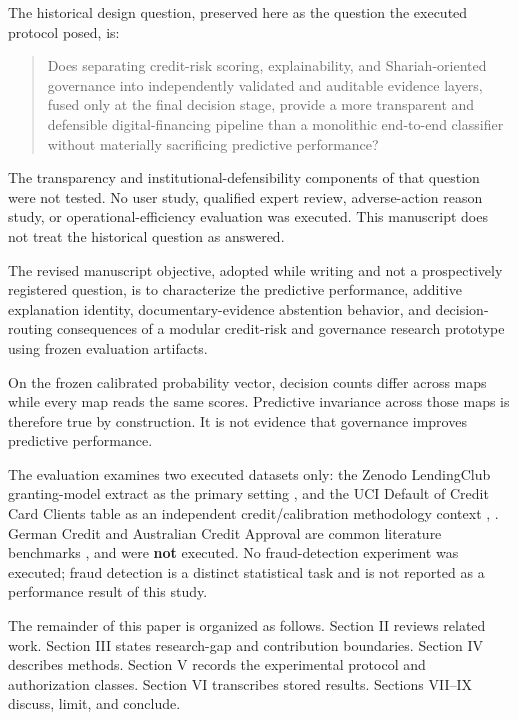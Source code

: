 \documentclass{ieeeaccess}
\begin{document}
The historical design question, preserved here as the question the executed protocol posed, is:

\begin{quote}
Does separating credit-risk scoring, explainability, and Shariah-oriented governance into independently validated and auditable evidence layers, fused only at the final decision stage, provide a more transparent and defensible digital-financing pipeline than a monolithic end-to-end classifier without materially sacrificing predictive performance?
\end{quote}

The transparency and institutional-defensibility components of that question were not tested. No user study, qualified expert review, adverse-action reason study, or operational-efficiency evaluation was executed. This manuscript does not treat the historical question as answered.

The revised manuscript objective, adopted while writing and not a prospectively registered question, is to characterize the predictive performance, additive explanation identity, documentary-evidence abstention behavior, and decision-routing consequences of a modular credit-risk and governance research prototype using frozen evaluation artifacts.

On the frozen calibrated probability vector, decision counts differ across maps while every map reads the same scores. Predictive invariance across those maps is therefore true by construction. It is not evidence that governance improves predictive performance.

The evaluation examines two executed datasets only: the Zenodo LendingClub granting-model extract as the primary setting \cite{b20}, and the UCI Default of Credit Card Clients table as an independent credit/calibration methodology context \cite{b4}, \cite{b21}. German Credit and Australian Credit Approval are common literature benchmarks \cite{b22}, \cite{b23} and were \textbf{not} executed. No fraud-detection experiment was executed; fraud detection is a distinct statistical task \cite{b19} and is not reported as a performance result of this study.

The remainder of this paper is organized as follows. Section II reviews related work. Section III states research-gap and contribution boundaries. Section IV describes methods. Section V records the experimental protocol and authorization classes. Section VI transcribes stored results. Sections VII--IX discuss, limit, and conclude.
\end{document}
